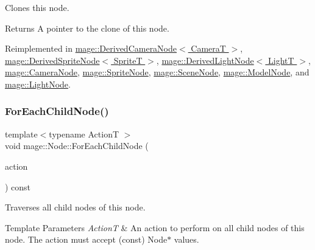 Clones this node.

\begin{DoxyReturn}{Returns}
A pointer to the clone of this node. 
\end{DoxyReturn}


Reimplemented in \hyperlink{classmage_1_1_derived_camera_node_aa965751029ebd6b41d3805b499a8304e}{mage\+::\+Derived\+Camera\+Node$<$ Camera\+T $>$}, \hyperlink{classmage_1_1_derived_sprite_node_ae1aa2b80d4ff8688635df017826c11a5}{mage\+::\+Derived\+Sprite\+Node$<$ Sprite\+T $>$}, \hyperlink{classmage_1_1_derived_light_node_acf8858989780bf45a45c55a7c5564314}{mage\+::\+Derived\+Light\+Node$<$ Light\+T $>$}, \hyperlink{classmage_1_1_camera_node_a002d3a2b41cda270a26ca5d8f3a17f55}{mage\+::\+Camera\+Node}, \hyperlink{classmage_1_1_sprite_node_a83a2a865b38670d64491a1066895e218}{mage\+::\+Sprite\+Node}, \hyperlink{classmage_1_1_scene_node_a42d0d53ab804d38ebd584d2de6490eeb}{mage\+::\+Scene\+Node}, \hyperlink{classmage_1_1_model_node_a34146201083015276b38240af307417f}{mage\+::\+Model\+Node}, and \hyperlink{classmage_1_1_light_node_aea97601d0a4b8073a1c655ca334af242}{mage\+::\+Light\+Node}.

\hypertarget{classmage_1_1_node_afedb523a462952ec29aed7504d0a71d4}{}\label{classmage_1_1_node_afedb523a462952ec29aed7504d0a71d4} 
\subsubsection{\texorpdfstring{For\+Each\+Child\+Node()}{ForEachChildNode()}}
{\footnotesize\ttfamily template$<$typename ActionT $>$ \\
void mage\+::\+Node\+::\+For\+Each\+Child\+Node (\begin{DoxyParamCaption}\item[{ActionT}]{action }\end{DoxyParamCaption}) const}

Traverses all child nodes of this node.


\begin{DoxyTemplParams}{Template Parameters}
{\em ActionT} & An action to perform on all child nodes of this node. The action must accept ({\ttfamily const}) {\ttfamily Node$\ast$} values. \\
\hline
\end{DoxyTemplParams}
\hypertarget{classmage_1_1_node_a86668c371e1452204b52f2896cbb16fd}{}\label{classmage_1_1_node_a86668c371e1452204b52f2896cbb16fd} 
